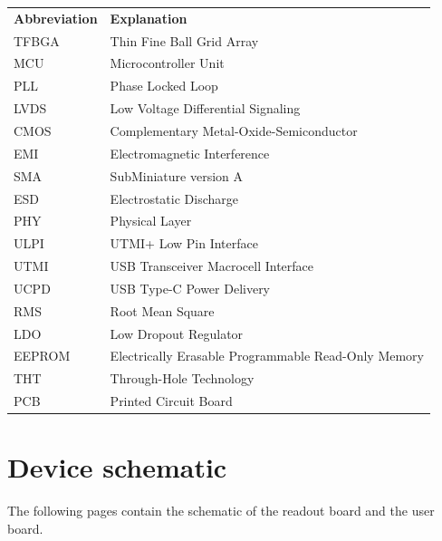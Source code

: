 \documentclass[twoside]{ctuthesis}
\theoremstyle{plain}
\theoremstyle{definition}
\theoremstyle{note}
\begin{document}
\newpage
\begin{tabularx}{\linewidth}
	{ l >{\raggedright\arraybackslash}X }
	\bfseries Abbreviation & \bfseries Explanation\\\Midrule
	TFBGA & Thin Fine Ball Grid Array\\
	MCU & Microcontroller Unit\\
	PLL & Phase Locked Loop\\
	LVDS & Low Voltage Differential Signaling\\
	CMOS & Complementary Metal-Oxide-Semiconductor\\
	EMI & Electromagnetic Interference\\
	SMA & SubMiniature version A\\
	ESD & Electrostatic Discharge\\
	PHY & Physical Layer\\
	ULPI & UTMI+ Low Pin Interface\\
	UTMI & USB Transceiver Macrocell Interface\\
	UCPD & USB Type-C Power Delivery\\
	RMS & Root Mean Square\\
	LDO & Low Dropout Regulator\\
	EEPROM & Electrically Erasable Programmable Read-Only Memory\\
	THT & Through-Hole Technology\\
	PCB & Printed Circuit Board\\
\end{tabularx}

\chapter*{Device schematic}
The following pages contain the schematic of the readout board and the user board. 
\noindent


\end{document}

